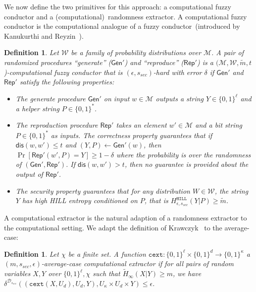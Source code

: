 \documentclass[11pt]{article}
\newcommand{\class}[1]{{\ensuremath{\mathsf{#1}}}}
\newcommand{\gen}{\ensuremath{\class{Gen}}\xspace}
\newcommand{\rep}{\ensuremath{\class{Rep}}\xspace}
\newcommand{\zo}{\ensuremath{\{0, 1\}}}
\newcommand{\dis}{\ensuremath{\mathsf{dis}}}
\newcommand{\hill}{\ensuremath{\mathtt{HILL}}\xspace}
\newcommand{\cext}{\ensuremath{\mathtt{cext}}}
\newtheorem{definition}[theorem]{Definition}
\begin{document}
We now define the two primitives for this approach: a computational fuzzy conductor and a (computational)~randomness extractor.  A computational fuzzy conductor is the computational analogue of a fuzzy conductor~(introduced by Kanukurthi and Reyzin~\cite{KanukurthiR09}).
\begin{definition}
\label{def:comp fuzzy cond}
Let $\mathcal{W}$ be a family of probability distributions over $\mathcal{M}$.  A pair of randomized procedures ``generate'' ($\gen'$) and ``reproduce'' ($\rep'$) is a $(\mathcal{M}, \mathcal{W}, \tilde{m}, t$)-computational fuzzy conductor that is $(\epsilon, s_{sec})$-hard with error $\delta$ if $\gen'$ and $\rep'$ satisfy the following properties:
\begin{itemize}
\item The generate procedure $\gen'$ on input $w\in \mathcal{M}$ outputs a string $Y\in\{0,1\}^\ell$ and a helper string $P\in\{0,1\}^*$.
\item The reproduction procedure $\rep'$ takes an element $w'\in\mathcal{M}$ and a bit string $P\in\{0,1\}^*$ as inputs.  The \emph{correctness} property guarantees that if $\dis(w, w')\leq t$ and $(Y, P)\leftarrow \gen'(w)$, then $\Pr[\rep'( w', P) = Y] \geq 1-\delta$ where the probability is over the randomness of $(\gen', \rep')$.  
If $\dis(w, w') > t$, then no guarantee is provided about the output of $\rep'$.
\item The \emph{security} property guarantees that for any distribution $W\in \mathcal{W}$, the string $Y$ has high HILL entropy conditioned on $P$, that is $H^{\hill}_{\epsilon, s_{sec}}(Y |P)\geq \tilde{m}$.
\end{itemize}
\end{definition}

A computational extractor is the natural adaption of a randomness extractor to the computational setting.  We adapt the definition of Krawczyk~\cite{krawczyk2010cryptographic} to the average-case:
\begin{definition}
Let $\chi$ be a finite set.
A function $\cext: \zo^\ell \times \{0,1\}^d \rightarrow \{0,1\}^\kappa$ a \emph{$(m, s_{sec}, \epsilon)$-average-case computational extractor} if for all pairs
of random variables $X, Y$ over $\zo^\ell, \chi$ such that
$\tilde{H}_\infty(X|Y) \ge m$, we have $\delta^{\mathcal{D}_{s_{sec}}}((\cext(X, U_d), U_d, Y), U_\kappa\times
U_d \times Y) \le \epsilon$.
\end{definition}
\end{document}
